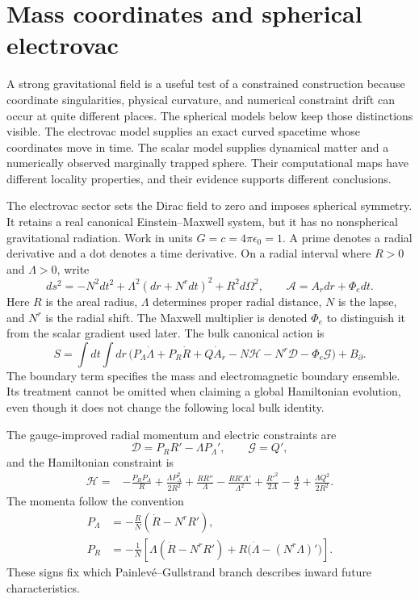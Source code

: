 \section{Mass coordinates and spherical electrovac}
\label{c:strong:electrovac}

A strong gravitational field is a useful test of a constrained construction because coordinate singularities, physical curvature, and numerical constraint drift can occur at quite different places. The spherical models below keep those distinctions visible. The electrovac model supplies an exact curved spacetime whose coordinates move in time. The scalar model supplies dynamical matter and a numerically observed marginally trapped sphere. Their computational maps have different locality properties, and their evidence supports different conclusions.

The electrovac sector sets the Dirac field to zero and imposes spherical symmetry. It retains a real canonical Einstein--Maxwell system, but it has no nonspherical gravitational radiation. Work in units $G=c=4\pi\epsilon_0=1$. A prime denotes a radial derivative and a dot denotes a time derivative. On a radial interval where $R>0$ and $\Lambda>0$, write
\begin{equation}
 ds^2=-N^2dt^2+\Lambda^2(dr+N^r dt)^2+R^2d\Omega^2,
 \qquad \mathcal A=A_rdr+\Phi_e dt.
\end{equation}
Here $R$ is the areal radius, $\Lambda$ determines proper radial distance, $N$ is the lapse, and $N^r$ is the radial shift. The Maxwell multiplier is denoted $\Phi_e$ to distinguish it from the scalar gradient used later. The bulk canonical action is
\begin{equation}
 S=\int dt\int dr\,
 \bigl(P_\Lambda\dot\Lambda+P_R\dot R+Q\dot A_r
       -N\mathcal H-N^r\mathcal D-\Phi_e\mathcal G\bigr)+B_\partial.
\end{equation}
The boundary term specifies the mass and electromagnetic boundary ensemble. Its treatment cannot be omitted when claiming a global Hamiltonian evolution, even though it does not change the following local bulk identity.

The gauge-improved radial momentum and electric constraints are
\begin{equation}
 \mathcal D=P_RR'-\Lambda P_\Lambda',\qquad \mathcal G=Q',
\end{equation}
and the Hamiltonian constraint is
\begin{equation}
\begin{aligned}
 \mathcal H={}&-\frac{P_RP_\Lambda}{R}
 +\frac{\Lambda P_\Lambda^2}{2R^2}
 +\frac{RR''}{\Lambda}-\frac{RR'\Lambda'}{\Lambda^2}
 +\frac{R'^2}{2\Lambda}-\frac\Lambda2
 +\frac{\Lambda Q^2}{2R^2}.
\end{aligned}
\label{c:strong:electrovac-H}
\end{equation}
The momenta follow the convention
\begin{align}
 P_\Lambda&=-\frac RN(\dot R-N^rR'),\\
 P_R&=-\frac1N\left[\Lambda(\dot R-N^rR')
                  +R\bigl(\dot\Lambda-(N^r\Lambda)'\bigr)\right].
\end{align}
These signs fix which Painlev\'e--Gullstrand branch describes inward future characteristics.

